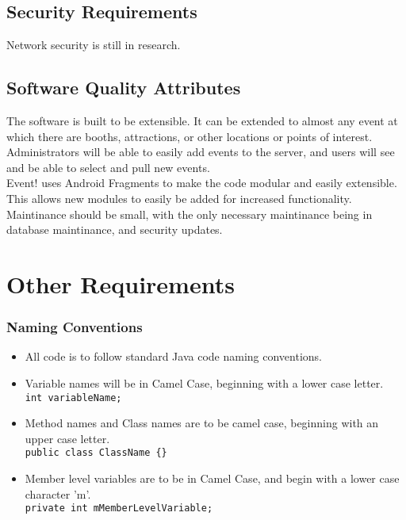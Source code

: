 \documentclass{scrreprt}
\begin{document}
\section{Security Requirements}
Network security is still in research.

\section{Software Quality Attributes}
The software is built to be extensible. It can be extended to almost any event at
which there are booths, attractions, or other locations or points of interest. \\ 
Administrators will be able to easily add events to the server, and users will see
and be able to select and pull new events. \\
Event! uses Android Fragments to make the code modular and easily extensible. 
This allows new modules to easily be added for increased functionality. \\
Maintinance should be small, with the only necessary maintinance being in 
database maintinance, and security updates. \\

\chapter{Other Requirements}


\subsection{Naming Conventions}
\begin{itemize}
\item All code is to follow standard Java code naming conventions.
\item Variable names will be in Camel Case, beginning with a lower case letter.\\
\texttt{int variableName;}
\item Method names and Class names are to be camel case, beginning with an upper case letter. \\
\texttt{public class ClassName \{\}}
\item Member level variables are to be in Camel Case, and begin with a lower case character 'm'. \\
\texttt{private int mMemberLevelVariable;}
\end{itemize}
\end{document}
